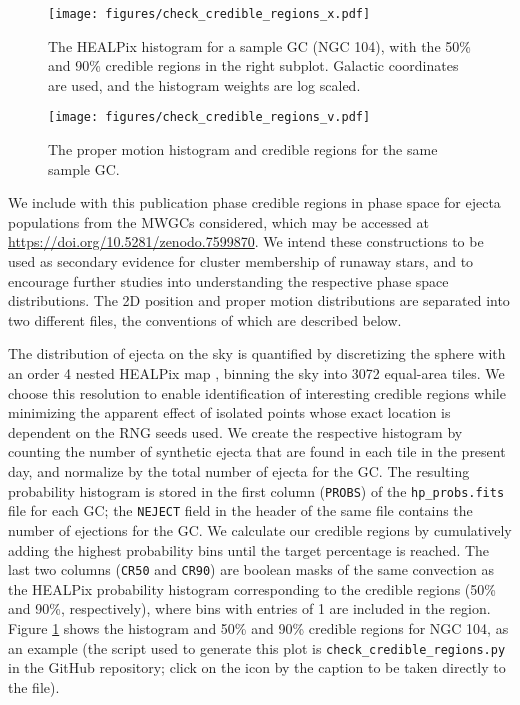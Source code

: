 \documentclass[twocolumn]{aastex631}
\begin{document}
\begin{figure}
    \centering
    \texttt{[image: figures/check\_credible\_regions\_x.pdf]}
    \caption{
        The HEALPix histogram for a sample GC (NGC 104), with the 50\% and 90\% credible regions in the right subplot.
        Galactic coordinates are used, and the histogram weights are log scaled.
    }
    \label{fig:check_credible_regions_x}
\end{figure}

\begin{figure}
    \centering
    \texttt{[image: figures/check\_credible\_regions\_v.pdf]}
    \caption{
        The proper motion histogram and credible regions for the same sample GC.
    }
    \label{fig:check_credible_regions_v}
\end{figure}

We include with this publication phase credible regions in phase space for ejecta populations from the MWGCs considered, which may be accessed at \url{https://doi.org/10.5281/zenodo.7599870}.
We intend these constructions to be used as secondary evidence for cluster membership of runaway stars, and to encourage further studies into understanding the respective phase space distributions.
The 2D position and proper motion distributions are separated into two different files, the conventions of which are described below.

The distribution of ejecta on the sky is quantified by discretizing the sphere with an order 4 nested HEALPix map \citep{2005ApJ...622..759G}, binning the sky into 3072 equal-area tiles.
We choose this resolution to enable identification of interesting credible regions while minimizing the apparent effect of isolated points whose exact location is dependent on the RNG seeds used.
We create the respective histogram by counting the number of synthetic ejecta that are found in each tile in the present day, and normalize by the total number of ejecta for the GC.
The resulting probability histogram is stored in the first column (\texttt{PROBS}) of the \texttt{hp\_probs.fits} file for each GC; the \texttt{NEJECT} field in the header of the same file contains the number of ejections for the GC.
We calculate our credible regions by cumulatively adding the highest probability bins until the target percentage is reached.
The last two columns (\texttt{CR50} and \texttt{CR90}) are boolean masks of the same convection as the HEALPix probability histogram corresponding to the credible regions (50\% and 90\%, respectively), where bins with entries of 1 are included in the region.
Figure \ref{fig:check_credible_regions_x} shows the histogram and 50\% and 90\% credible regions for NGC 104, as an example (the script used to generate this plot is \texttt{check\_credible\_regions.py} in the GitHub repository; click on the icon by the caption to be taken directly to the file).
\end{document}
